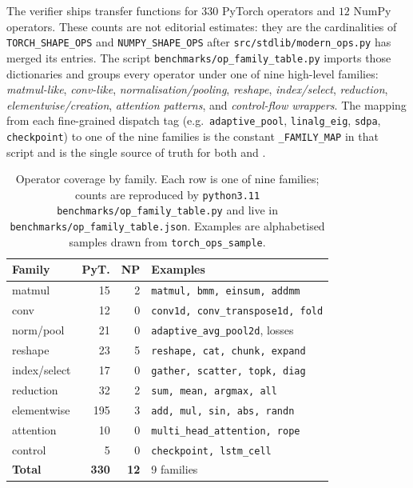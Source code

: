 \documentclass{article}
\theoremstyle{plain}
\theoremstyle{definition}
\newcommand{\code}[1]{\texttt{\small #1}}
\begin{document}
The verifier ships transfer functions for $330$ PyTorch operators
and $12$ NumPy operators.  These counts are not editorial estimates:
they are the cardinalities of \code{TORCH\_SHAPE\_OPS} and
\code{NUMPY\_SHAPE\_OPS} after \code{src/stdlib/modern\_ops.py} has
merged its entries.  The script \code{benchmarks/op\_family\_table.py}
imports those dictionaries and groups every operator under one of
nine high-level families: \emph{matmul-like}, \emph{conv-like},
\emph{normalisation/pooling}, \emph{reshape}, \emph{index/select},
\emph{reduction}, \emph{elementwise/creation}, \emph{attention
patterns}, and \emph{control-flow wrappers}.  The mapping from each
fine-grained dispatch tag (e.g.\ \code{adaptive\_pool},
\code{linalg\_eig}, \code{sdpa}, \code{checkpoint}) to one of the
nine families is the constant \code{\_FAMILY\_MAP} in that script
and is the single source of truth for both 
and .

\begin{table}[t]
\centering\small
\caption{Operator coverage by family.  Each row is one of nine
families; counts are reproduced by
\code{python3.11 benchmarks/op\_family\_table.py} and live in
\code{benchmarks/op\_family\_table.json}.  Examples are alphabetised
samples drawn from \code{torch\_ops\_sample}.}
\label{tab:opcoverage}
\begin{tabular}{lrrl}
\toprule
Family       & PyT. & NP & Examples \\
\midrule
matmul       & 15 & 2 & \code{matmul, bmm, einsum, addmm}\\
conv         & 12 & 0 & \code{conv1d, conv\_transpose1d, fold}\\
norm/pool    & 21 & 0 & \code{adaptive\_avg\_pool2d}, losses\\
reshape      & 23 & 5 & \code{reshape, cat, chunk, expand}\\
index/select & 17 & 0 & \code{gather, scatter, topk, diag}\\
reduction    & 32 & 2 & \code{sum, mean, argmax, all}\\
elementwise  & 195 & 3 & \code{add, mul, sin, abs, randn}\\
attention    & 10 & 0 & \code{multi\_head\_attention, rope}\\
control      & 5 & 0 & \code{checkpoint, lstm\_cell}\\
\midrule
\textbf{Total} & \textbf{330} & \textbf{12} & 9 families\\
\bottomrule
\end{tabular}
\end{table}
\end{document}
